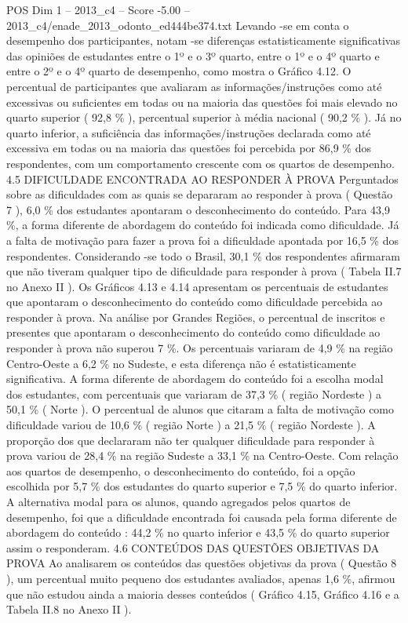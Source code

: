 \begin{textsample}{POS Dim 1 – 2013\_c4 – Score -5.00 – 2013\_c4/enade\_2013\_odonto\_ed444be374.txt}
Levando -se em conta o desempenho dos participantes, notam -se diferenças estatisticamente significativas das opiniões de estudantes entre o 1º e o 3º quarto, entre o 1º e o 4º quarto e entre o 2º e o 4º quarto de desempenho, como mostra o Gráfico 4.12.
O percentual de participantes que avaliaram as informações/instruções como até excessivas ou suficientes em todas ou na maioria das questões foi mais elevado no quarto superior ( 92,8 \% ), percentual superior à média nacional ( 90,2 \% ).
Já no quarto inferior, a suficiência das informações/instruções declarada como até excessiva em todas ou na maioria das questões foi percebida por 86,9 \% dos respondentes, com um comportamento crescente com os quartos de desempenho. 4.5 DIFICULDADE ENCONTRADA AO RESPONDER À PROVA Perguntados sobre as dificuldades com as quais se depararam ao responder à prova ( Questão 7 ), 6,0 \% dos estudantes apontaram o desconhecimento do conteúdo.
Para 43,9 \%, a forma diferente de abordagem do conteúdo foi indicada como dificuldade.
Já a falta de motivação para fazer a prova foi a dificuldade apontada por 16,5 \% dos respondentes.
Considerando -se todo o Brasil, 30,1 \% dos respondentes afirmaram que não tiveram qualquer tipo de dificuldade para responder à prova ( Tabela II.7 no Anexo II ).
Os Gráficos 4.13 e 4.14 apresentam os percentuais de estudantes que apontaram o desconhecimento do conteúdo como dificuldade percebida ao responder à prova.
Na análise por Grandes Regiões, o percentual de inscritos e presentes que apontaram o desconhecimento do conteúdo como dificuldade ao responder à prova não superou 7 \%.
Os percentuais variaram de 4,9 \% na região Centro-Oeste a 6,2 \% no Sudeste, e esta diferença não é estatisticamente significativa.
A forma diferente de abordagem do conteúdo foi a escolha modal dos estudantes, com percentuais que variaram de 37,3 \% ( região Nordeste ) a 50,1 \% ( Norte ).
O percentual de alunos que citaram a falta de motivação como dificuldade variou de 10,6 \% ( região Norte ) a 21,5 \% ( região Nordeste ).
A proporção dos que declararam não ter qualquer dificuldade para responder à prova variou de 28,4 \% na região Sudeste a 33,1 \% na Centro-Oeste.
Com relação aos quartos de desempenho, o desconhecimento do conteúdo, foi a opção escolhida por 5,7 \% dos estudantes do quarto superior e 7,5 \% do quarto inferior.
A alternativa modal para os alunos, quando agregados pelos quartos de desempenho, foi que a dificuldade encontrada foi causada pela forma diferente de abordagem do conteúdo : 44,2 \% no quarto inferior e 43,5 \% do quarto superior assim o responderam. 4.6 CONTEÚDOS DAS QUESTÕES OBJETIVAS DA PROVA Ao analisarem os conteúdos das questões objetivas da prova ( Questão 8 ), um percentual muito pequeno dos estudantes avaliados, apenas 1,6 \%, afirmou que não estudou ainda a maioria desses conteúdos ( Gráfico 4.15, Gráfico 4.16 e a Tabela II.8 no Anexo II ).

\end{textsample}

